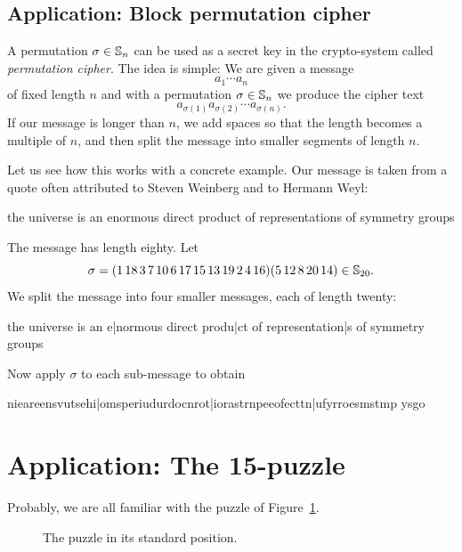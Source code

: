 \begin{optional}
\section{Application: Block permutation cipher}
A permutation $\sigma\in\mathbb{S}_n$ can be used as a secret key in the crypto-system 
called \emph{permutation cipher}. The idea is simple: We are given a message
\[
a_1\cdots a_n
\]
of fixed length $n$ and with a permutation $\sigma\in\mathbb{S}_n$ 
we produce the cipher text 
\[
a_{\sigma(1)}a_{\sigma(2)}\cdots a_{\sigma(n)}.
\]
If our message is longer than  $n$, we add spaces so that the length becomes a multiple of $n$, 
and then split the message into smaller segments of length  $n$.

Let us see how this works with a concrete example. Our message is taken from a quote often attributed to  
Steven Weinberg and to  
Hermann Weyl:
\begin{center}
    \textsf{the universe is an enormous direct product of representations of symmetry groups}
\end{center}
The message has length eighty. 
Let 
\[
\sigma=(1\,18\,3\,7\,10\,6\,17\,15\,13\,19\,2\,4\,16)(5\,12\,8\,20\,14)\in\mathbb{S}_{20}.
\]
We split the message into four smaller messages, each of length twenty:
\begin{center}
\textsf{the universe is an e|normous direct produ|ct of representation|s of symmetry groups}
\end{center}
Now apply $\sigma$ to each sub-message to obtain 
\begin{center}
\textsf{n\textvisiblespace i\textvisiblespace eareensv\textvisiblespace u\textvisiblespace tsehi|omsperiudur\textvisiblespace docn\textvisiblespace rot|iorastrnp\textvisiblespace eeofect\textvisiblespace tn|ufyrroesmstmp ysgo\textvisiblespace\textvisiblespace}
\end{center}
\end{optional}

\section{Application: The 15-puzzle}

Probably, we are all familiar with the puzzle of Figure~\ref{fig:toy}. 

\begin{figure}[ht]
    \centering
    
    \caption{The puzzle in its standard position.}
    \label{fig:toy}
\end{figure}

